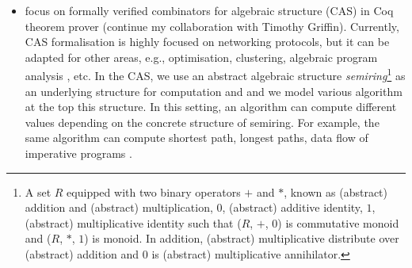 \documentclass[a4paper]{article}
\begin{document}
\begin{itemize}
\item focus on formally verified combinators for algebraic structure (CAS) in Coq theorem prover 
	(continue my collaboration with Timothy Griffin). 
	Currently, CAS formalisation is highly focused on networking protocols, but it can be 
	adapted for other areas, e.g., optimisation, clustering, algebraic program 
	analysis , etc. In the CAS, we use an abstract algebraic structure 
	\emph{semiring}\footnote{A set $R$ equipped with two binary operators $+$ and $*$, 
	known as (abstract) addition and (abstract) multiplication, $0$, (abstract) additive identity, 
	$1$, (abstract) multiplicative identity such that 
	($R$, $+$, $0$) is commutative monoid and ($R$, $*$, $1$) is monoid. 
	In addition, (abstract) multiplicative distribute over (abstract)  addition and 
	$0$ is (abstract) multiplicative annihilator.} as an underlying structure
	for computation and and we model various algorithm at the top this 
	structure. In this setting, an algorithm can compute different values depending 
	on the concrete structure of semiring. For example, the same algorithm 
	can compute shortest path, longest paths, 
	data flow of imperative programs \cite{gondran2008graphs, 10.1145/2500365.2500613}.
	

\end{itemize}



 

\end{document}
